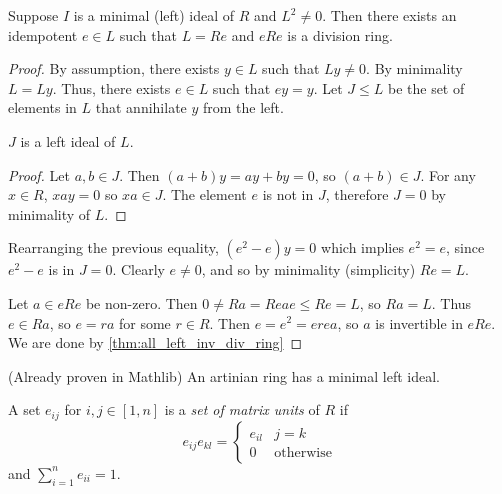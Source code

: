   \begin{theorem}
    \label{thm:brauer_lemma}
    Suppose $I$ is a minimal (left) ideal of $R$ and $L^2 \neq 0$. Then there exists an idempotent $e \in L$ such that $L = Re$ and $eRe$ is a division ring.
  \end{theorem}
  \begin{proof}
    By assumption, there exists $y \in L$ such that $Ly \neq 0$. By minimality $L = Ly$. Thus, there exists $e \in L$ such that $e y = y$. Let $J \leq L$ be the set of elements in $L$ that annihilate $y$ from the left.
    \begin{claim}
      $J$ is a left ideal of $L$.
    \end{claim}
    \begin{proof}
      Let $a, b \in J$. Then $(a + b) y = a y + b y = 0$, so $(a + b) \in J$. For any $x \in R$, $x a y = 0$ so $xa \in J$. The element $e$ is not in $J$, therefore $J = 0$ by minimality of $L$. 
    \end{proof}
    Rearranging the previous equality, $(e^2 - e) y = 0$ which implies $e^2 = e$, since $e^2 - e$ is in $J = 0$. Clearly $e \neq 0$, and so by minimality (simplicity) $Re = L$.

    Let $a \in eRe$ be non-zero. Then $0 \neq Ra = Reae \leq Re = L$, so $Ra = L$. Thus $e \in Ra$, so $e = r a$ for some $r \in R$. Then $e = e^2 = e r e a$, so $a$ is invertible in $eRe$. We are done by \ref{thm:all_left_inv_div_ring}
    
  \end{proof}

  \begin{theorem}
    (Already proven in Mathlib) An artinian ring has a minimal left ideal.
  \end{theorem}

  \begin{definition}
    \label{def:matrixunits}
    A set $e_{ij}$ for $i, j \in [1, n]$ is a \textit{set of matrix units} of $R$ if 
    $$
      e_{ij}e_{kl} = 
      \begin{cases} 
        e_{il} & j = k \\ 
        0 & \text{otherwise} \end{cases}
    $$ 
    and $\sum_{i=1}^n e_{ii} = 1$.
  \end{definition}

